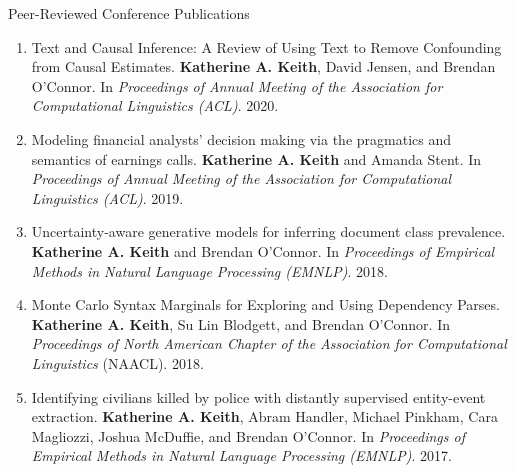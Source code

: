 \documentclass{resume} %
\begin{document}
%
\begin{rSection}{Peer-Reviewed Conference Publications}
\begin{enumerate}

\item Text and Causal Inference: A Review of Using Text to Remove Confounding from Causal Estimates. \textbf{Katherine A. Keith}, David Jensen, and Brendan O'Connor. In \emph{Proceedings of Annual Meeting of the Association for Computational Linguistics (ACL)}. 2020.  

\item Modeling financial analysts' decision making via the pragmatics and semantics of earnings calls. 
\textbf{Katherine A. Keith} and Amanda Stent. 
In \emph{Proceedings of Annual Meeting of the Association for Computational Linguistics (ACL)}.  2019. 

\item Uncertainty-aware generative models for inferring document class prevalence.
\textbf{Katherine A. Keith} and Brendan O'Connor. 
In \emph{Proceedings of Empirical Methods in Natural Language Processing (EMNLP)}. 2018. 

\item Monte Carlo Syntax Marginals for Exploring and Using Dependency Parses.
\textbf{Katherine A. Keith}, Su Lin Blodgett, and Brendan O'Connor.
In \emph{Proceedings of North American Chapter of the Association for Computational Linguistics} (NAACL). 2018.

\item Identifying civilians killed by police with distantly supervised entity-event extraction. 
\textbf{Katherine A. Keith}, Abram Handler, Michael Pinkham, Cara Magliozzi, Joshua McDuffie, and Brendan O'Connor. In \emph{Proceedings of Empirical Methods in Natural Language Processing (EMNLP)}. 2017. 
\end{enumerate}

\end{rSection}

\end{document}
